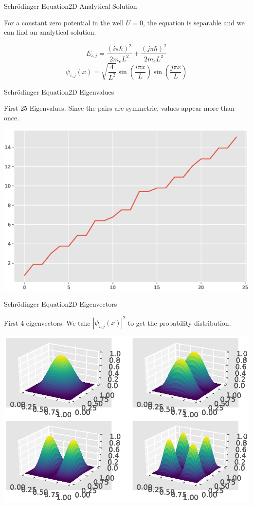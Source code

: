 \documentclass[mathserif]{beamer}
\begin{document}
\begin{frame}{Schrödinger Equation}{2D Analytical Solution}

 For a constant zero potential in the well \(U = 0 \), the equation
 is separable and we can find an analytical solution.

 \[ E_{i,j} = \frac{{(i \pi \hbar)}^2}{2 m_e L^2}+\frac{{(j \pi \hbar)}^2}{2 m_e L^2} \]
 \[ \psi_{i,j} (x) = \sqrt{\frac{4}{L^2}} \sin \left( \frac{i \pi x }{L} \right) \sin \left( \frac{j \pi x }{L} \right) \]

\end{frame}

\begin{frame}{Schrödinger Equation}{2D Eigenvalues}

 First 25 Eigenvalues.
 Since the pairs are symmetric, values appear more than once.

 \centering
 \includegraphics[scale=0.4]{images/Ea25.eps}

\end{frame}

\begin{frame}{Schrödinger Equation}{2D Eigenvectors}

 First 4 eigenvectors.
 We take \(| \psi_{i,j}(x) |^2 \) to get the probability distribution.

 \centering
 \includegraphics[scale=0.6]{images/psi1234.eps}

\end{frame}
\end{document}
